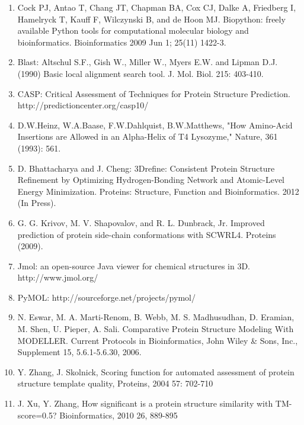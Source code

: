 \documentclass{article}
\begin{document}
\begin{enumerate}

\item Cock PJ, Antao T, Chang JT, Chapman BA, Cox CJ, Dalke A, Friedberg I, Hamelryck T, Kauff F, Wilczynski B, and de Hoon MJ. Biopython: freely available Python tools for computational molecular biology and bioinformatics. Bioinformatics 2009 Jun 1; 25(11) 1422-3.

\item Blast:  Altschul S.F., Gish W., Miller W., Myers E.W. and Lipman D.J. (1990)
Basic local alignment search tool.  J. Mol. Biol. 215: 403-410.

\item CASP: Critical Assessment of Techniques for Protein Structure Prediction. http://predictioncenter.org/casp10/

\item D.W.Heinz, W.A.Baase, F.W.Dahlquist, B.W.Matthews, "How Amino-Acid Insertions are Allowed in an Alpha-Helix of T4 Lysozyme," Nature, 361 (1993): 561.

\item D. Bhattacharya and J. Cheng: 3Drefine: Consistent Protein Structure Refinement by Optimizing Hydrogen-Bonding Network and Atomic-Level Energy Minimization.
Proteins: Structure, Function and Bioinformatics. 2012 (In Press).

\item G. G. Krivov, M. V. Shapovalov, and R. L. Dunbrack, Jr. Improved prediction of protein side-chain conformations with SCWRL4. Proteins (2009).

\item Jmol: an open-source Java viewer for chemical structures in 3D. http://www.jmol.org/ 

\item PyMOL: http://sourceforge.net/projects/pymol/

\item N. Eswar, M. A. Marti-Renom, B. Webb, M. S. Madhusudhan, D. Eramian, M. Shen, U. Pieper, A. Sali. Comparative Protein Structure Modeling With MODELLER. Current Protocols in Bioinformatics, John Wiley \& Sons, Inc., Supplement 15, 5.6.1-5.6.30, 2006.

\item Y. Zhang, J. Skolnick, Scoring function for automated assessment of protein structure template quality, Proteins, 2004 57: 702-710

\item J. Xu, Y. Zhang, How significant is a protein structure similarity with TM-score=0.5? Bioinformatics, 2010 26, 889-895


\end{enumerate}
\end{document}
